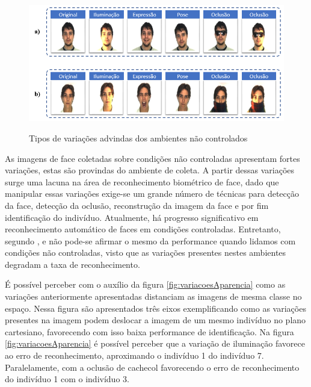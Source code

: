 \begin{figure}[H]
\centering
\caption{Tipos de variações advindas dos ambientes não controlados}
\includegraphics[scale = 0.76]{imgs/variacoes.png}
\label{fig:variacoes}
\end{figure}

 
As imagens de face coletadas sobre condições não controladas apresentam fortes variações, estas são provindas do ambiente de coleta. A partir dessas variações surge uma lacuna na área de reconhecimento biométrico de face, dado que manipular essas variações exige-se um grande número de técnicas para detecção da face, detecção da oclusão, reconstrução da imagem da face e por fim identificação do indivíduo.
Atualmente, há progresso significativo em reconhecimento automático de faces em condições controladas. Entretanto, segundo ,  e  não pode-se afirmar o mesmo da performance quando lidamos com condições não controladas, visto que as variações presentes nestes ambientes degradam a taxa de reconhecimento.

É possível perceber com o auxílio da figura \ref{fig:variacoesAparencia} como as variações anteriormente apresentadas distanciam as imagens de mesma classe no espaço. Nessa figura são apresentados três eixos exemplificando como as variações presentes na imagem podem deslocar a imagem de um mesmo indivíduo no plano cartesiano, favorecendo com isso baixa performance de identificação. Na figura \ref{fig:variacoesAparencia} é possível perceber que a variação de iluminação favorece ao erro de reconhecimento, aproximando o indivíduo 1 do indivíduo 7. Paralelamente, com a oclusão de cachecol favorecendo o erro de reconhecimento do indivíduo 1 com o indivíduo 3.


